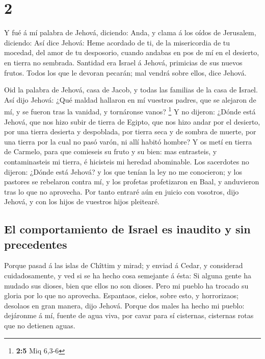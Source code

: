 \hypertarget{section-1}{%
\section{2}\label{section-1}}

 Y fué á mí palabra de Jehová, diciendo: 
Anda, y clama á los oídos de Jerusalem, diciendo: Así dice Jehová: Heme
acordado de ti, de la misericordia de tu mocedad, del amor de tu
desposorio, cuando andabas en pos de mí en el desierto, en tierra no
sembrada.  Santidad era Israel á Jehová, primicias de sus
nuevos frutos. Todos los que le devoran pecarán; mal vendrá sobre ellos,
dice Jehová.

 Oid la palabra de Jehová, casa de Jacob, y todas las
familias de la casa de Israel.  Así dijo Jehová: ¿Qué
maldad hallaron en mí vuestros padres, que se alejaron de mí, y se
fueron tras la vanidad, y tornáronse vanos? \footnote{\textbf{2:5} Miq
  6,3-6}  Y no dijeron: ¿Dónde está Jehová, que nos hizo
subir de tierra de Egipto, que nos hizo andar por el desierto, por una
tierra desierta y despoblada, por tierra seca y de sombra de muerte, por
una tierra por la cual no pasó varón, ni allí habitó hombre?
 Y os metí en tierra de Carmelo, para que comieseis su
fruto y su bien: mas entrasteis, y contaminasteis mi tierra, é hicisteis
mi heredad abominable.  Los sacerdotes no dijeron: ¿Dónde
está Jehová? y los que tenían la ley no me conocieron; y los pastores se
rebelaron contra mí, y los profetas profetizaron en Baal, y anduvieron
tras lo que no aprovecha.  Por tanto entraré aún en juicio
con vosotros, dijo Jehová, y con los hijos de vuestros hijos pleitearé.

\hypertarget{el-comportamiento-de-israel-es-inaudito-y-sin-precedentes}{%
\subsection{El comportamiento de Israel es inaudito y sin
precedentes}\label{el-comportamiento-de-israel-es-inaudito-y-sin-precedentes}}

 Porque pasad á las islas de Chîttim y mirad; y enviad á
Cedar, y considerad cuidadosamente, y ved si se ha hecho cosa semejante
á ésta:  Si alguna gente ha mudado sus dioses, bien que
ellos no son dioses. Pero mi pueblo ha trocado su gloria por lo que no
aprovecha.  Espantaos, cielos, sobre esto, y horrorizaos;
desolaos en gran manera, dijo Jehová.  Porque dos males
ha hecho mi pueblo: dejáronme á mí, fuente de agua viva, por cavar para
sí cisternas, cisternas rotas que no detienen aguas.

